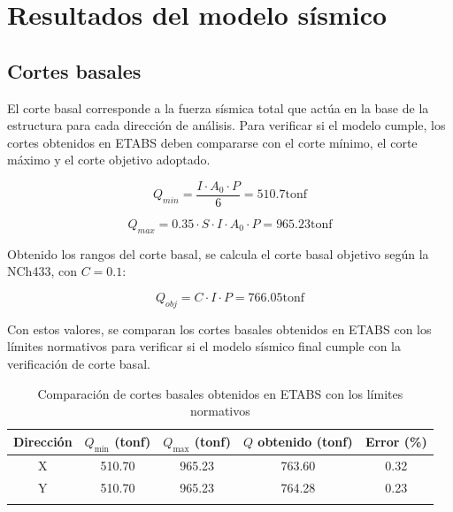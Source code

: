 \section{Resultados del modelo sísmico}
\subsection{Cortes basales}

El corte basal corresponde a la fuerza sísmica total que actúa en la base de la estructura para cada dirección de análisis. Para verificar si el modelo cumple, los cortes obtenidos en ETABS deben compararse con el corte mínimo, el corte máximo y el corte objetivo adoptado.

\begin{equation}
Q_{min} = \frac{I \cdot A_0 \cdot P}{6} = 510.7 \text{tonf}
\end{equation}

\begin{equation}
Q_{max} = 0.35 \cdot S \cdot I \cdot A_0 \cdot P = 965.23 \text{tonf}
\end{equation}

Obtenido los rangos del corte basal, se calcula el corte basal objetivo según la NCh433\cite{NCh433:1996}, con $C=0.1$:

\begin{equation}
Q_{obj} = C \cdot I \cdot P = 766.05 \text{tonf}
\end{equation}

Con estos valores, se comparan los cortes basales obtenidos en ETABS con los límites normativos para verificar si el modelo sísmico final cumple con la verificación de corte basal.

\begin{table}[H]
    \centering
    \caption{Comparación de cortes basales obtenidos en ETABS con los límites normativos}
    \begin{tabular}{ccccc}
    \toprule
    Dirección & $Q_{\min}$ (tonf) & $Q_{\max}$ (tonf) & $Q$ obtenido (tonf) & Error (\%) \\
    \midrule
    X & 510.70 & 965.23 & 763.60 & 0.32 \\
    Y & 510.70 & 965.23 & 764.28 & 0.23 \\
    \bottomrule
    \vspace{0.001cm}
    \end{tabular}
    
\end{table}

